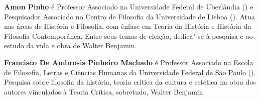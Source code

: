\textbf{Amon Pinho} é Professor Associado na Universidade Federal de Uberlândia () e Pesquisador Associado no Centro de Filosofia da Universidade de Lisboa (). Atua nas
áreas de História e Filosofia, com ênfase em Teoria da História e História da Filosofia
Contemporânea. Entre seus temas de eleição, dedica"-se à pesquisa e ao estudo da vida e obra de
Walter Benjamin.

\textbf{Francisco De Ambrosis Pinheiro Machado} é Professor Associado na Escola de Filosofia, Letras e Ciências Humanas da Universidade Federal de São Paulo (). Pesquisa sobre filosofia da história, teoria crítica da cultura e estética na obra dos autores vinculados à Teoria Crítica, sobretudo, Walter Benjamin.


